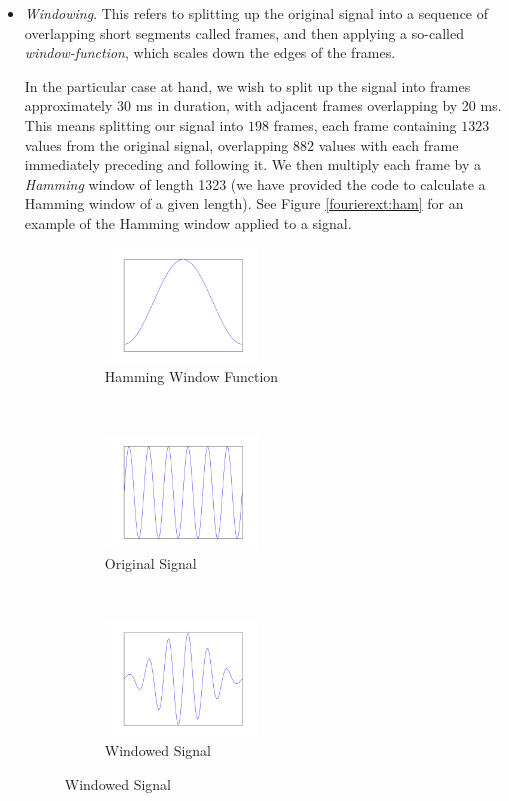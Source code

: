 \begin{itemize}
\item \emph{Windowing}. This refers to splitting up the original signal into a sequence of overlapping
short segments called frames, and then applying a so-called \emph{window-function}, which scales down
the edges of the frames.

In the particular case at hand, we wish to split up the signal into frames approximately 30 ms in
duration, with adjacent frames overlapping by 20 ms.
This means splitting our signal into $198$ frames, each frame containing $1323$ values from the original signal, overlapping $882$ values with each frame
immediately preceding and following it.
We then multiply each frame by a \emph{Hamming} window of length 1323 (we have provided the code to calculate a Hamming window of a given length).
See Figure \ref{fourierext:ham} for an example of the Hamming window applied to a signal.

\begin{figure}
\centering

\begin{subfigure}[t]{.3\textwidth}
\centering
\includegraphics[height=1.2in]{HammingWindowFunction.pdf}
\caption*{Hamming Window Function}
\end{subfigure}
~
\begin{subfigure}[t]{.3\textwidth}
\centering
\includegraphics[height=1.2in]{Original.pdf}
\caption*{Original Signal}
\end{subfigure}
~
\begin{subfigure}[t]{.3\textwidth}
\centering
\includegraphics[height=1.2in]{WindowedSignal.pdf}
\caption*{Windowed Signal}
\end{subfigure}


\end{figure}
\end{itemize}
